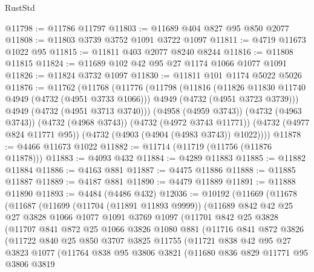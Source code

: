 \begin{lexlean}{RustStd}
\begin{coremodule}
@11798 := @11786 @11797
@11803 := @11689 @404 @827 @95 @850 @2077
@11808 := @11803 @3739 @3752 @1091 @3722 @1097
@11811 := @4719 @11673 @1022 @95
@11815 := @11811 @403 @2077 @8240 @8244
@11816 := @11808 @11815
@11824 := @11689 @102 @42 @95 @27 @1174 @1066 @1077 @1091
@11826 := @11824 @3732 @1097
@11830 := @11811 @101 @1174 @5022 @5026
@11876 := @11762
    (@11768
      (@11776
        (@11798
          (@11816
            (@11826 @11830 @11740 @4949 (@4732 (@4951 @3733 @1066)))
            @4949
            (@4732 (@4951 @3723 @3739)))
          @4949
          (@4732 (@4951 @3713 @3740)))
        (@4958 (@4959 @3743))
        (@4732 (@4963 @3743))
        (@4732 (@4968 @3743))
        (@4732 (@4972 @3743 @11771))
        (@4732 (@4977 @824 @11771 @95))
        (@4732 (@4903 (@4904 (@4983 @3743)) @1022))))
@11878 := @4466 @11673 @1022
@11882 := @11714 (@11719 (@11756 (@11876 @11878)))
@11883 := @4093 @432
@11884 := @4289 @11883
@11885 := @11882 @11884
@11886 := @4163 @881
@11887 := @4475 @11886
@11888 := @11885 @11887
@11889 := @4187 @881
@11890 := @4479 @11889
@11891 := @11888 @11890
@11893 := @4484 (@4486 @432)
@12036 := @10192
    (@11669
      (@11678
        (@11687
          (@11699
            (@11704 (@11891 @11893 @9999))
            (@11689
              @842
              @42
              @25
              @27
              @3828
              @1066
              @1077
              @1091
              @3769
              @1097
              (@11701
                @842
                @25
                @3828
                (@11707
                  @841
                  @872
                  @25
                  @1066
                  @3826
                  @1080
                  @881
                  (@11716
                    @841
                    @872
                    @3826
                    (@11722
                      @840
                      @25
                      @850
                      @3707
                      @3825
                      @11755
                      (@11721
                        @838
                        @42
                        @95
                        @27
                        @3823
                        @1077
                        (@11764
                          @838
                          @95
                          @3806
                          @3821
                          (@11680
                            @836
                            @829
                            @11771
                            @95
                            @3806
                            @3819

\end{coremodule}
\end{lexlean}
